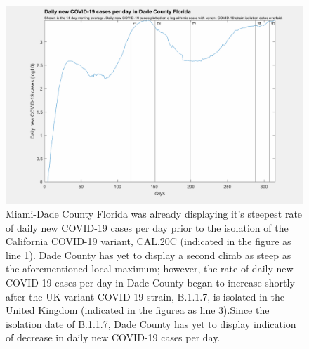 \documentclass[]{article}
\begin{document}
\begin{figure}[!h]
	\includegraphics[width=\linewidth]{images/dade_cases_strains_log.png}
	\caption{Miami-Dade County Florida was already displaying it's steepest rate of daily new COVID-19 cases per day prior to the isolation of the California COVID-19 variant, CAL.20C (indicated in the figure as line 1). Dade County has yet to display a second climb as steep as the aforementioned local maximum; however, the rate of daily new COVID-19 cases per day in Dade County began to increase shortly after the UK variant COVID-19 strain, B.1.1.7, is isolated in the United Kingdom (indicated in the figurea as line 3).Since the isolation date of B.1.1.7, Dade County has yet to display indication of decrease in daily new COVID-19 cases per day. }
	\label{fig:images/dade_cases_strains_logLabel}
\end{figure}
\end{document}

